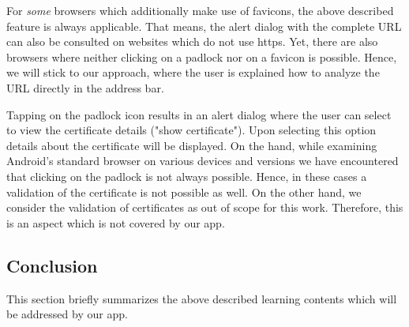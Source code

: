 \begin{description}[leftmargin=0cm]
For \textit{some} browsers which additionally make use of favicons, the above described feature is always applicable.
That means, the alert dialog with the complete URL can also be consulted on websites which do not use https.
Yet, there are also browsers where neither clicking on a padlock nor on a favicon is possible.
Hence, we will stick to our approach, where the user is explained how to analyze the URL directly in the address bar.
		\item[Certificate Verification]Tapping on the padlock icon results in an alert dialog where the user can select to view the certificate details ("show certificate").
Upon selecting this option details about the certificate will be displayed.
On the hand, while examining Android's standard browser on various devices and versions we have encountered that clicking on the padlock is not always possible. 
Hence, in these cases a validation of the certificate is not possible as well.
On the other hand, we consider the validation of certificates as out of scope for this work.
Therefore, this is an aspect which is not covered by our app.

\end{description}



\subsection{Conclusion}

This section briefly summarizes the above described learning contents which will be addressed by our app.

